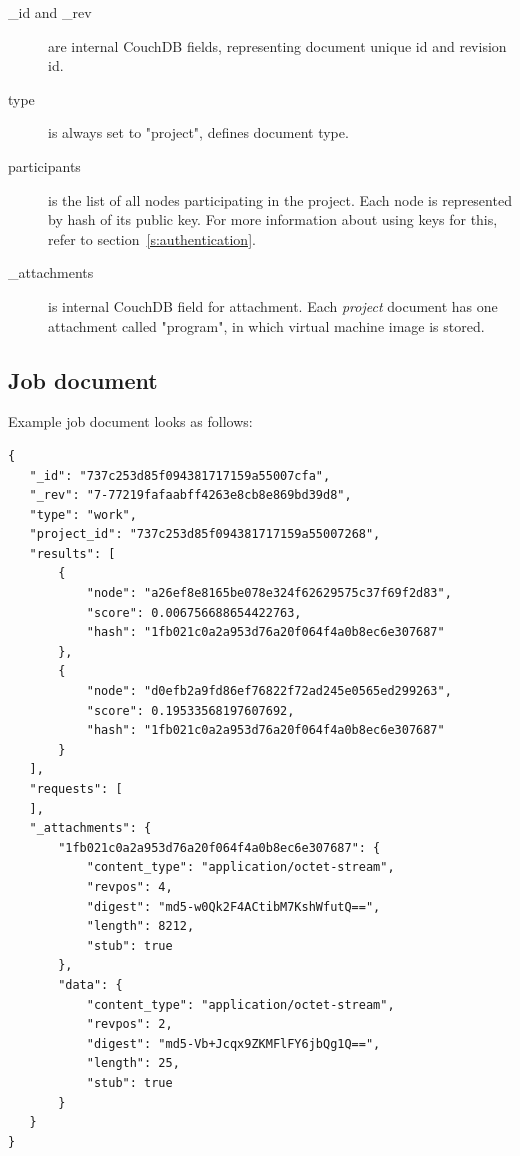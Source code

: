 \begin{description}
\item[\_id and \_rev] are internal CouchDB fields, representing document unique id and revision id.
\item[type] is always set to "project", defines document type.
\item[participants] is the list of all nodes participating in the project. Each node is represented by hash of its public key. For more information about using keys for this, refer to section~\ref{s:authentication}.
\item[\_attachments] is internal CouchDB field for attachment. Each \emph{project} document has one attachment called "program", in which virtual machine image is stored.
\end{description}

\subsection{Job document}

Example job document looks as follows:

\begin{lstlisting}[caption=Job document in JSON format.]
{
   "_id": "737c253d85f094381717159a55007cfa",
   "_rev": "7-77219fafaabff4263e8cb8e869bd39d8",
   "type": "work",
   "project_id": "737c253d85f094381717159a55007268",
   "results": [
       {
           "node": "a26ef8e8165be078e324f62629575c37f69f2d83",
           "score": 0.006756688654422763,
           "hash": "1fb021c0a2a953d76a20f064f4a0b8ec6e307687"
       },
       {
           "node": "d0efb2a9fd86ef76822f72ad245e0565ed299263",
           "score": 0.19533568197607692,
           "hash": "1fb021c0a2a953d76a20f064f4a0b8ec6e307687"
       }
   ],
   "requests": [
   ],
   "_attachments": {
       "1fb021c0a2a953d76a20f064f4a0b8ec6e307687": {
           "content_type": "application/octet-stream",
           "revpos": 4,
           "digest": "md5-w0Qk2F4ACtibM7KshWfutQ==",
           "length": 8212,
           "stub": true
       },
       "data": {
           "content_type": "application/octet-stream",
           "revpos": 2,
           "digest": "md5-Vb+Jcqx9ZKMFlFY6jbQg1Q==",
           "length": 25,
           "stub": true
       }
   }
}
\end{lstlisting}

